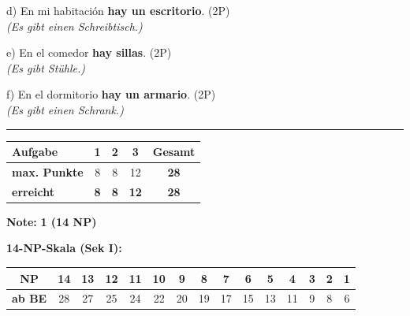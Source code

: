 \documentclass[11pt, a4paper]{article}
\newcommand{\lsg}[1]{\textcolor{loesung}{\textbf{#1}}}
\begin{document}
\vspace{0.8em}

\noindent
d) En mi habitación \lsg{hay un escritorio}. \hfill (2P) \\
\hspace*{0.5cm}\textit{(Es gibt einen Schreibtisch.)}

\vspace{0.8em}

\noindent
e) En el comedor \lsg{hay sillas}. \hfill (2P) \\
\hspace*{0.5cm}\textit{(Es gibt Stühle.)}

\vspace{0.8em}

\noindent
f) En el dormitorio \lsg{hay un armario}. \hfill (2P) \\
\hspace*{0.5cm}\textit{(Es gibt einen Schrank.)}


\vspace{25pt}
\hrule
\vspace{10pt}

\noindent
\begin{tabularx}{\textwidth}{|X|c|c|c||c|}
\hline
\textbf{Aufgabe} & 1 & 2 & 3 & \textbf{Gesamt} \\
\hline
\textbf{max. Punkte} & 8 & 8 & 12 & \textbf{28} \\
\hline
\textbf{erreicht} & \lsg{8} & \lsg{8} & \lsg{12} & \lsg{28} \\
\hline
\end{tabularx}

\vspace{10pt}

\begin{flushright}
\textbf{Note:} \lsg{1 (14 NP)}
\end{flushright}

\vspace{1em}

\textbf{14-NP-Skala (Sek I):}

\begin{tabular}{|c|c|c|c|c|c|c|c|c|c|c|c|c|c|c|}
\hline
\textbf{NP} & 14 & 13 & 12 & 11 & 10 & 9 & 8 & 7 & 6 & 5 & 4 & 3 & 2 & 1 \\
\hline
\textbf{ab BE} & 28 & 27 & 25 & 24 & 22 & 20 & 19 & 17 & 15 & 13 & 11 & 9 & 8 & 6 \\
\hline
\end{tabular}
\end{document}
